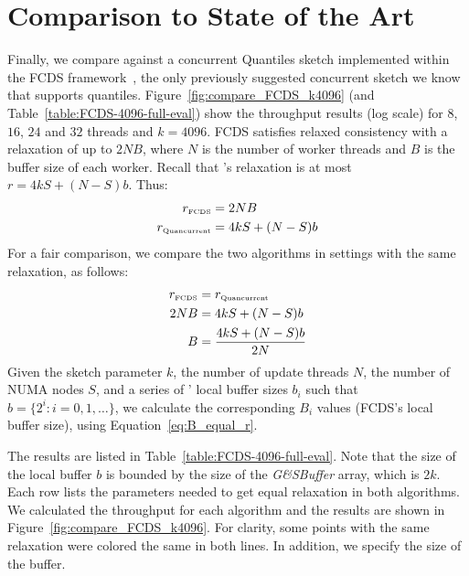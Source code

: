 \section{Comparison to State of the Art}
\label{sec:compare} 
Finally, we compare \mysketch against a concurrent Quantiles sketch implemented within the FCDS framework~\cite{Rinberg_2020_fast_sketches}, the only previously suggested concurrent sketch we know that supports quantiles. Figure~\ref{fig:compare_FCDS_k4096} (and Table~\ref{table:FCDS-4096-full-eval}) show the throughput results (log scale) for $8$, $16$, $24$ and $32$ threads and $k=4096$.
FCDS satisfies relaxed consistency with a relaxation of up to $2NB$, where $N$ is the number of worker threads and $B$ is the buffer size of each worker. Recall that \mysketch's relaxation is at most $r = 4kS+(N-S)b$. Thus:
\begin{align}
    r_{\scriptscriptstyle\rm FCDS} &= 2NB \\
    r_{\scriptscriptstyle\rm Quancurrent} &= 4kS+(N-S)b
\end{align}
For a fair comparison, we compare the two algorithms in settings with the same relaxation, as follows:
\begin{align}
    r_{\scriptscriptstyle\rm FCDS} &= r_{\scriptscriptstyle\rm Quancurrent} \\
    2NB &= 4kS+(N-S)b \\ 
    B &= \frac{4kS+(N-S)b}{2N}\label{eq:B_equal_r}
\end{align}
 Given the sketch parameter $k$, the number of update threads $N$, the number of NUMA nodes $S$, and a series of \mysketch' local buffer sizes $b_i$ such that $b=\{2^i: i = 0,1,\dots\}$, we calculate the corresponding $B_i$ values (FCDS's local buffer size), using Equation~\ref{eq:B_equal_r}.
 
 The results are listed in Table~\ref{table:FCDS-4096-full-eval}. Note that the size of the local buffer $b$ is bounded by the size of the \emph{G\&SBuffer} array, which is $2k$. Each row lists the parameters needed to get equal relaxation in both algorithms. We calculated the throughput for each algorithm and the results are shown in Figure~\ref{fig:compare_FCDS_k4096}. For clarity, some points with the same relaxation were colored the same in both lines. In addition, we specify the size of the buffer.


